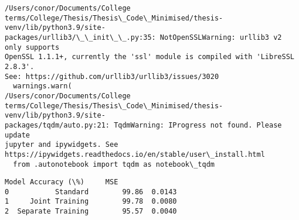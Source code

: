 \documentclass[11pt]{article}
\begin{document}
    \begin{Verbatim}[commandchars=\\\{\}]
/Users/conor/Documents/College
terms/College/Thesis/Thesis\_Code\_Minimised/thesis-venv/lib/python3.9/site-
packages/urllib3/\_\_init\_\_.py:35: NotOpenSSLWarning: urllib3 v2 only supports
OpenSSL 1.1.1+, currently the 'ssl' module is compiled with 'LibreSSL 2.8.3'.
See: https://github.com/urllib3/urllib3/issues/3020
  warnings.warn(
/Users/conor/Documents/College
terms/College/Thesis/Thesis\_Code\_Minimised/thesis-venv/lib/python3.9/site-
packages/tqdm/auto.py:21: TqdmWarning: IProgress not found. Please update
jupyter and ipywidgets. See
https://ipywidgets.readthedocs.io/en/stable/user\_install.html
  from .autonotebook import tqdm as notebook\_tqdm
    \end{Verbatim}

    
    \begin{Verbatim}[commandchars=\\\{\}]
               Model Accuracy (\%)     MSE
0           Standard        99.86  0.0143
1     Joint Training        99.78  0.0080
2  Separate Training        95.57  0.0040
    \end{Verbatim}

    

    
    
    
\end{document}
